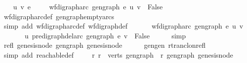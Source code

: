 \begin{isabellebody}
\isamarkupfalse%
\isanewline
\ \ \isamarkupfalse%
\ u\ v\ e\ \isanewline
\ \ \isamarkupfalse%
\ {\isachardoublequoteopen}wf{\isacharunderscore}{\kern0pt}digraph{\isachardot}{\kern0pt}arc\ gen{\isacharunderscore}{\kern0pt}graph\ e\ {\isacharparenleft}{\kern0pt}u{\isacharcomma}{\kern0pt}\ v{\isacharparenright}{\kern0pt}\ {\isasymequiv}\ False{\isachardoublequoteclose}\isanewline
\ \ \ \ \isamarkupfalse%
\ wf{\isacharunderscore}{\kern0pt}digraph{\isachardot}{\kern0pt}arc{\isacharunderscore}{\kern0pt}def\ gen{\isacharunderscore}{\kern0pt}graph{\isacharunderscore}{\kern0pt}empty{\isacharunderscore}{\kern0pt}arcs\isanewline
\ \ \ \ \isamarkupfalse%
\ {\isacharparenleft}{\kern0pt}simp\ add{\isacharcolon}{\kern0pt}\ wf{\isacharunderscore}{\kern0pt}digraph{\isachardot}{\kern0pt}arc{\isacharunderscore}{\kern0pt}def\ wf{\isacharunderscore}{\kern0pt}digraph{\isacharunderscore}{\kern0pt}def{\isacharparenright}{\kern0pt}\ \isanewline
\ \ \isamarkupfalse%
\ \isamarkupfalse%
\ {\isachardoublequoteopen}wf{\isacharunderscore}{\kern0pt}digraph{\isachardot}{\kern0pt}arc\ gen{\isacharunderscore}{\kern0pt}graph\ e\ {\isacharparenleft}{\kern0pt}u{\isacharcomma}{\kern0pt}\ v{\isacharparenright}{\kern0pt}\ {\isasymLongrightarrow}\isanewline
\ \ \ \ \ \ \ u\ {\isasymrightarrow}\isactrlsup {\isacharplus}{\kern0pt}\isactrlbsub pre{\isacharunderscore}{\kern0pt}digraph{\isachardot}{\kern0pt}del{\isacharunderscore}{\kern0pt}arc\ gen{\isacharunderscore}{\kern0pt}graph\ e\isactrlesub \ v\ {\isasymLongrightarrow}\ False{\isachardoublequoteclose}\isanewline
\ \ \ \ \isamarkupfalse%
\ simp\isanewline
{}\isamarkupfalse%
\ \ \isanewline
\ \ \isamarkupfalse%
\ refl{\isacharcolon}{\kern0pt}\ {\isachardoublequoteopen}genesis{\isacharunderscore}{\kern0pt}node\ {\isasymrightarrow}\isactrlsup {\isacharasterisk}{\kern0pt}\isactrlbsub gen{\isacharunderscore}{\kern0pt}graph\isactrlesub \ genesis{\isacharunderscore}{\kern0pt}node{\isachardoublequoteclose}\isanewline
\ \ \ \ \isamarkupfalse%
\ gen{\isacharunderscore}{\kern0pt}gen\ rtrancl{\isacharunderscore}{\kern0pt}on{\isacharunderscore}{\kern0pt}refl\isanewline
\ \ \ \ \isamarkupfalse%
\ {\isacharparenleft}{\kern0pt}simp\ add{\isacharcolon}{\kern0pt}\ reachable{\isacharunderscore}{\kern0pt}def{\isacharparenright}{\kern0pt}\ \isanewline
\ \ \isamarkupfalse%
\ {\isachardoublequoteopen}{\isasymforall}r{\isachardot}{\kern0pt}\ r\ {\isasymin}\ verts\ gen{\isacharunderscore}{\kern0pt}graph\ {\isasymlongrightarrow}\ r\ {\isasymrightarrow}\isactrlsup {\isacharasterisk}{\kern0pt}\isactrlbsub gen{\isacharunderscore}{\kern0pt}graph\isactrlesub \ genesis{\isacharunderscore}{\kern0pt}node{\isachardoublequoteclose}\ \ \isanewline

\end{isabellebody}
